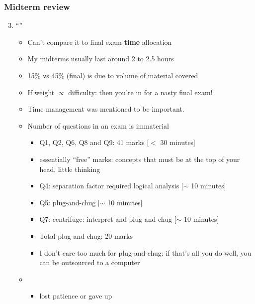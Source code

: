 \begin{frame}\frametitle{Midterm review}
	\begin{enumerate}
		\setcounter{enumi}{2}
		\item	``{\color{myOrange}{Too long}}''	
		\begin{itemize}
			\item	Can't compare it to final exam \textbf{time} allocation
			\item	My midterms usually last around 2 to 2.5 hours
			\item	15\% vs 45\% (final) is due to volume of material covered
			\item	If weight $\propto$ difficulty: then you're in for a nasty final exam!
			\item	Time management was mentioned to be important.
			\item	Number of questions in an exam is immaterial
			\begin{itemize}
				\item	Q1, Q2, Q6, Q8 and Q9: 41 marks [$<$ 30 minutes]
				\item	essentially ``free'' marks: concepts that must be at the top of your head, little thinking
				\item	Q4: separation factor required logical analysis [$\sim$ 10 minutes]
				\item	Q5: plug-and-chug [$\sim$ 10 minutes]
				\item	Q7: centrifuge: interpret and plug-and-chug [$\sim$ 10 minutes]
				\item	Total plug-and-chug: 20 marks
				\item	I don't care too much for plug-and-chug: if that's all you do well, you can be outsourced to a computer
			\end{itemize}
			\item	{\color{myBlue}{Surprising aspect: 65\% of students left early}}
			\begin{itemize}
				\item	lost patience or gave up
			\end{itemize}
		\end{itemize}
	\end{enumerate}
\end{frame}

